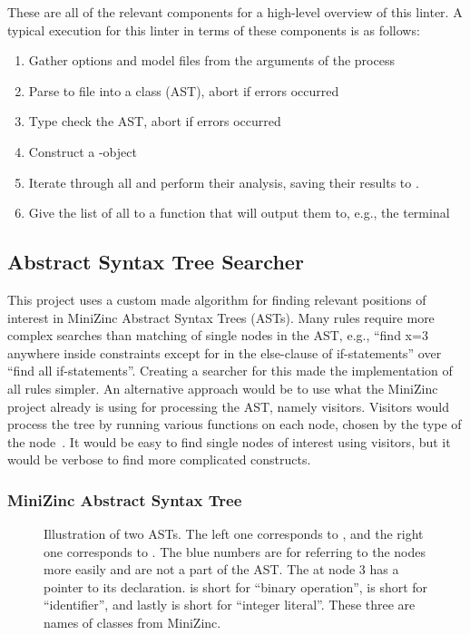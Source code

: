 \documentclass[a4paper,12pt]{article}
\begin{document}
These are all of the relevant components for a high-level overview of this linter. A
typical execution for this linter in terms of these components is as follows:
\begin{enumerate}
  \item Gather options and model files from the arguments of the process
  \item Parse to file into a  class (AST), abort if errors occurred
  \item Type check the AST, abort if errors occurred
  \item Construct a -object
  \item Iterate through all  and perform their analysis, saving their
  results to .
  \item Give the list of all  to a function that will output them to, e.g.\@,
  the terminal
\end{enumerate}

\subsection{Abstract Syntax Tree Searcher}\label{sec:searcher}
This project uses a custom made algorithm for finding relevant positions of interest in
MiniZinc Abstract Syntax Trees (ASTs). Many rules require more complex searches than
matching of single nodes in the AST, e.g., ``find x=3 anywhere inside constraints
except for in the else-clause of if-statements'' over ``find all if-statements''. Creating
a searcher for this made the implementation of all rules simpler. An alternative
approach would be to use what the MiniZinc project already is using for processing the
AST, namely visitors. Visitors would process the tree by running various functions on each
node, chosen by the type of the node~\cite[p.~331]{DesignPatterns94}. It would be easy to find
single nodes of interest using visitors, but it would be verbose to find
more complicated constructs.

\subsubsection{MiniZinc Abstract Syntax Tree}
\begin{figure}[ht]
  \centering
  \newif\ifshowastnumbers\showastnumberstrue
  
  \caption{Illustration of two ASTs. The left one corresponds to ,
    and the right one corresponds to . The blue numbers are
    for referring to the nodes more easily and are not a part of the AST. The  at
    node 3 has a pointer to its declaration.  is short for ``binary operation'',
     is short for ``identifier'', and lastly  is short for ``integer
    literal''. These three are names of classes from MiniZinc.}%
  \label{fig:ast:searcher}
\end{figure}
\end{document}

